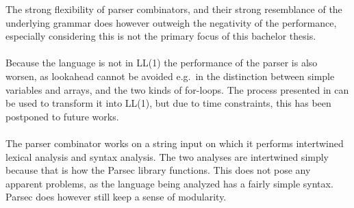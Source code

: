The strong flexibility of parser combinators, and their strong resemblance of the underlying
grammar does however outweigh the negativity of the performance, especially considering this is
not the primary focus of this bachelor thesis.
\\
\\
Because the language is not in LL(1) the performance of the parser is also worsen, as lookahead
cannot be avoided e.g.\ in the distinction between simple variables and arrays, and the two
kinds of for-loops. The process presented in \cite{torben} can be used to transform it into
LL(1), but due to time constraints, this has been postponed to future works.
\\
\\
The parser combinator works on a string input on which it performs intertwined lexical analysis
and syntax analysis. The two analyses are intertwined simply because that is how the Parsec
library functions. This does not pose any apparent problems, as the language being analyzed has
a fairly simple syntax. Parsec does however still keep a sense of modularity.

